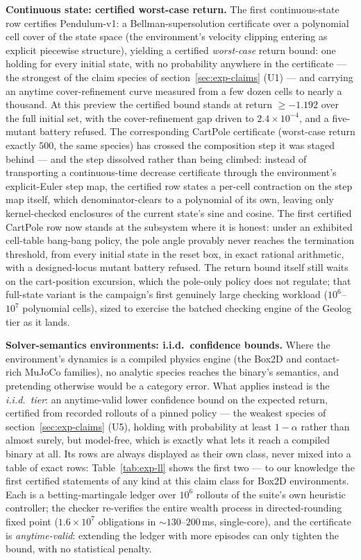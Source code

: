 \textbf{Continuous state: certified worst-case return.} The first
continuous-state row certifies Pendulum-v1: a Bellman-supersolution
certificate over a polynomial cell cover of the state space (the
environment's velocity clipping entering as explicit piecewise
structure), yielding a certified \emph{worst-case} return bound: one
holding for every initial state, with no probability anywhere in the
certificate --- the strongest of the claim species of
section~\ref{sec:exp-claims} (U1) --- and carrying an anytime
cover-refinement curve measured from a few dozen cells to nearly a
thousand. At this preview the certified bound stands at return
$\ge -1.192$ over the full initial set, with the cover-refinement gap
driven to $2.4\times 10^{-4}$, and a five-mutant battery refused. The corresponding
CartPole certificate (worst-case return exactly $500$, the same
species) has crossed the composition step it was staged behind ---
and the step dissolved rather than being climbed: instead of
transporting a continuous-time decrease certificate through the
environment's explicit-Euler step map, the certified row states a
per-cell contraction on the step map itself, which
denominator-clears to a polynomial of its own, leaving only
kernel-checked enclosures of the current state's sine and cosine.
The first certified CartPole row now stands at the subsystem where
it is honest: under an exhibited cell-table bang-bang policy, the
pole angle provably never reaches the termination threshold, from
every initial state in the reset box, in exact rational arithmetic,
with a designed-locus mutant battery refused. The return bound
itself still waits on the cart-position excursion, which the
pole-only policy does not regulate; that full-state variant is the
campaign's first genuinely large checking workload ($10^6$--$10^7$
polynomial cells), sized to exercise the batched checking engine of
the Geolog tier as it lands.

\textbf{Solver-semantics environments: i.i.d.\ confidence
bounds.} Where the environment's dynamics is a compiled physics
engine (the Box2D and contact-rich MuJoCo families), no analytic
species reaches the binary's semantics, and pretending otherwise
would be a category error. What applies instead is the
\emph{i.i.d.\ tier}: an anytime-valid lower confidence bound on
the expected return, certified from recorded rollouts of a pinned
policy --- the weakest species of section~\ref{sec:exp-claims} (U5),
holding with probability at least $1 - \alpha$ rather than almost
surely, but model-free, which is exactly what lets it reach a
compiled binary at all. Its rows are always displayed as their own
class, never mixed into a table of exact rows: Table~\ref{tab:exp-ll}
shows the first two --- to our knowledge the first certified
statements of any kind at this claim class for Box2D environments.
Each is a betting-martingale ledger over $10^6$
rollouts of the suite's own heuristic controller; the checker
re-verifies the entire wealth process in directed-rounding fixed
point ($1.6 \times 10^7$ obligations in $\sim 130$--$200$\,ms,
single-core), and the certificate is \emph{anytime-valid}: extending
the ledger with more episodes can only tighten the bound, with no
statistical penalty.

